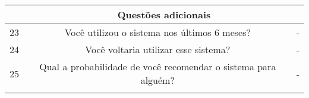 \begin{anexosenv}
\begin{table}[]
{\begin{tabular}{ccc}
\rowcolor[HTML]{C0C0C0} 
\multicolumn{1}{|c|}{\cellcolor[HTML]{C0C0C0}} & \multicolumn{2}{c|}{\cellcolor[HTML]{C0C0C0}Questões adicionais} \\ \hline
\multicolumn{1}{|c|}{23} & \multicolumn{1}{c|}{Você utilizou o sistema nos últimos 6 meses?} & \multicolumn{1}{c|}{-} \\ \hline
\multicolumn{1}{|c|}{24} & \multicolumn{1}{c|}{Você voltaria utilizar esse sistema?} & \multicolumn{1}{c|}{-} \\ \hline
\multicolumn{1}{|c|}{25} & \multicolumn{1}{c|}{Qual a probabilidade de você recomendar o sistema para alguém?} & \multicolumn{1}{c|}{-} \\ \hline
\multicolumn{1}{l}{} & \multicolumn{1}{l}{} & \multicolumn{1}{l}{}
\end{tabular}
}
\end{table}

\end{anexosenv}

